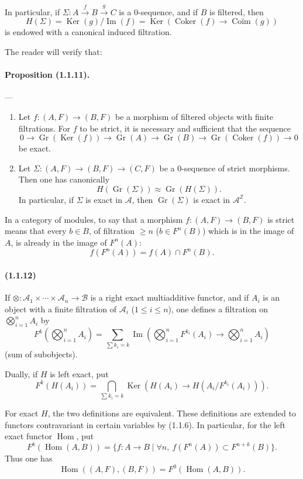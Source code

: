 \documentclass[10pt]{article}
\newcommand{\Z}{\mathbb Z}
\newcommand{\Gr}{\operatorname{Gr}}
\newcommand{\Ker}{\operatorname{Ker}}
\newcommand{\Coker}{\operatorname{Coker}}
\newcommand{\Imop}{\operatorname{Im}}
\newcommand{\Hom}{\operatorname{Hom}}
\newcommand{\calA}{\mathcal A}
\newcommand{\calB}{\mathcal B}
\begin{document}
In particular, if $\Sigma:A\xrightarrow{f}B\xrightarrow{g}C$ is a $0$-sequence, and if $B$ is filtered, then
\[
H(\Sigma)=\Ker(g)/\Imop(f)=\Ker(\Coker(f)\to\operatorname{Coïm}(g))
\]
is endowed with a canonical induced filtration.

The reader will verify that:

\paragraph{Proposition (1.1.11).} --- \begin{enumerate}[label=(\roman*)]
\item Let $f:(A,F)\to(B,F)$ be a morphism of filtered objects with finite filtrations. For $f$ to be strict, it is necessary and sufficient that the sequence
\[
0\to\Gr(\Ker(f))\to\Gr(A)\to\Gr(B)\to\Gr(\Coker(f))\to0
\]
be exact.
\item Let $\Sigma:(A,F)\to(B,F)\to(C,F)$ be a $0$-sequence of strict morphisms. Then one has canonically
\[
H(\Gr(\Sigma))\approx\Gr(H(\Sigma)).
\]
In particular, if $\Sigma$ is exact in $\calA$, then $\Gr(\Sigma)$ is exact in $\calA^{\Z}$.
\end{enumerate}

In a category of modules, to say that a morphism $f:(A,F)\to(B,F)$ is strict means that every $b\in B$, of filtration $\ge n$ ($b\in F^n(B)$) which is in the image of $A$, is already in the image of $F^n(A)$:
\[
f(F^n(A))=f(A)\cap F^n(B).
\]

\paragraph{(1.1.12)} If $\otimes:\calA_1\times\cdots\times\calA_n\to\calB$ is a right exact multiadditive functor, and if $A_i$ is an object with a finite filtration of $\calA_i$ ($1\le i\le n$), one defines a filtration on $\bigotimes_{i=1}^nA_i$ by
\[
F^k\left(\bigotimes_{i=1}^n A_i\right)=\sum_{\sum k_i=k}\Imop\left(\bigotimes_{i=1}^n F^{k_i}(A_i)\to\bigotimes_{i=1}^n A_i\right)
\]
(sum of subobjects).

Dually, if $H$ is left exact, put
\[
F^k(H(A_i))=\bigcap_{\sum k_i=k}\Ker\left(H(A_i)\to H(A_i/F^{k_i}(A_i))\right).
\]

For exact $H$, the two definitions are equivalent. These definitions are extended to functors contravariant in certain variables by (1.1.6). In particular, for the left exact functor $\Hom$, put
\[
F^k(\Hom(A,B))=\{f:A\to B\mid \forall n,\ f(F^n(A))\subset F^{n+k}(B)\}.
\]
Thus one has
\[
\Hom((A,F),(B,F))=F^0(\Hom(A,B)).
\]
\end{document}
